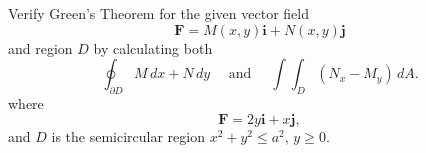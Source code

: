 \documentclass[11pt,letterpaper,boxed]{hmcpset}
\newcommand{\sand}{\quad \mbox{ and } \quad}
\newcommand{\VEC}[1]{\ensuremath{\mathbf{#1}}\xspace}
\begin{document}
\begin{solution}
\vfill
\end{solution}
\newpage

\begin{problem}[Colley 6.2 \#4]
Verify Green's Theorem for the given vector field
\[
	\VEC{F}  = M(x,y)\VEC{i} + N(x,y)\VEC{j}
\]
and region $D$ by calculating both 
\[
	\oint_{\partial D} M\,dx+N\,dy \sand \int\int_D (N_x-M_y)\,dA.
\]
where 
\[
	\VEC{F} =2y\VEC{i}+x\VEC{j},
\]
and $D$ is the semicircular region $x^2+y^2\leq a^2$, $y\geq 0$.
\end{problem}

\begin{solution}
\vfill
\end{solution}
\newpage
\end{document}

